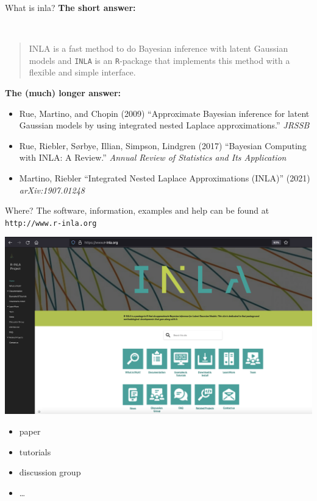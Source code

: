 \documentclass[
  ignorenonframetext,
]{beamer}
\providecommand{\tightlist}{%
  \setlength{\itemsep}{0pt}\setlength{\parskip}{0pt}}
\begin{document}
\begin{frame}[fragile]{What is inla?}
\protect\hypertarget{what-is-inla}{}
\textbf{The short answer:}\\
\strut \\

\begin{quote}
INLA is a fast method to do Bayesian inference with latent Gaussian
models and \texttt{INLA} is an \texttt{R}-package that implements this
method with a flexible and simple interface.
\end{quote}

\pause

\textbf{The (much) longer answer:}

\begin{itemize}
\tightlist
\item
  Rue, Martino, and Chopin (2009) ``Approximate Bayesian inference for
  latent Gaussian models by using integrated nested Laplace
  approximations.'' \emph{JRSSB}
\item
  Rue, Riebler, Sørbye, Illian, Simpson, Lindgren (2017) ``Bayesian
  Computing with INLA: A Review.'' \emph{Annual Review of Statistics and
  Its Application}
\item
  Martino, Riebler ``Integrated Nested Laplace Approximations (INLA)''
  (2021) \emph{arXiv:1907.01248}
\end{itemize}
\end{frame}

\begin{frame}[fragile]{Where?}
\protect\hypertarget{where}{}
The software, information, examples and help can be found at
\texttt{http://www.r-inla.org}

\begin{center}\includegraphics[width=0.5\linewidth]{graphics/rinla} \end{center}

\begin{itemize}
\tightlist
\item
  paper
\item
  tutorials
\item
  discussion group
\item
  \ldots{}
\end{itemize}
\end{frame}
\end{document}
